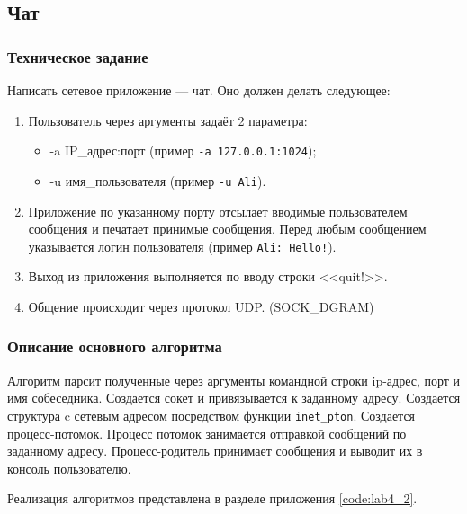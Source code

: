 \documentclass[a4paper,14pt]{extarticle}
\begin{document}
\subsection{Чат}
\subsubsection{Техническое задание}
Написать сетевое приложение --- чат. Оно должен делать следующее: 
\begin{enumerate}
	\item Пользователь через аргументы задаёт 2 параметра:
	\begin{itemize}
		\item -a IP\_адрес:порт (пример \texttt{-a 127.0.0.1:1024});
		\item -u имя\_пользователя (пример \texttt{-u Ali}).
	\end{itemize}
	\item Приложение по указанному порту отсылает вводимые пользователем сообщения и печатает принимые сообщения. Перед любым сообщением указывается логин пользователя (пример \texttt{Ali: Hello!}).
	\item Выход из приложения выполняется по вводу строки <<quit!>>.
	\item Общение происходит через протокол UDP. (SOCK\_DGRAM) 
\end{enumerate}

\subsubsection{Описание основного алгоритма}
Алгоритм парсит полученные через аргументы командной строки ip-адрес, порт и имя собеседника. Создается сокет и привязывается к заданному адресу. Создается структура c сетевым адресом посредством функции \verb|inet_pton|. Создается процесс-потомок. Процесс потомок занимается отправкой сообщений по заданному адресу. Процесс-родитель принимает сообщения и выводит их в консоль пользователю. 

Реализация алгоритмов представлена в разделе приложения \ref{code:lab4_2}.
\end{document}
